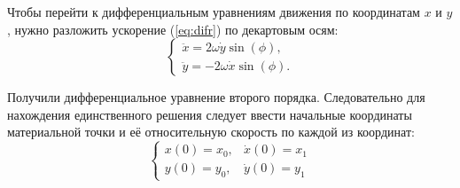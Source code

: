 Чтобы перейти к дифференциальным уравнениям движения по координатам $x$ и $y$, нужно разложить ускорение (\ref{eq:difr}) по декартовым осям:
\begin{equation}
	\begin{cases}
		\ddot{x} = 2\omega \dot{y} \sin(\phi),\\
		\ddot{y} = - 2\omega \dot{x}\sin(\phi).
	\end{cases}
\end{equation}
 
 Получили дифференциальное уравнение второго порядка. Следовательно для нахождения единственного решения следует ввести начальные координаты материальной точки и её относительную скорость по каждой из координат:
 \[
 	\begin{cases}
 		x(0) = x_{0}, & \dot{x}(0) = x_{1} \\
 		y(0) = y_{0}, & \dot{y}(0) = y_{1}
 	\end{cases}
 \]
